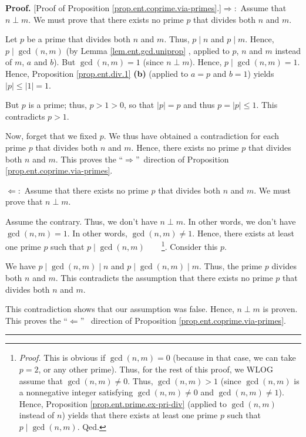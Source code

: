 \documentclass[numbers=enddot,12pt,final,onecolumn,notitlepage]{scrartcl}%
\numberwithin{exer}{subsection}
\theoremstyle{definition}
\newenvironment{proof}[1][Proof]{\noindent\textbf{#1.} }{\ \rule{0.5em}{0.5em}}
\begin{document}
\begin{proof}
[Proof of Proposition \ref{prop.ent.coprime.via-primes}.]$\Longrightarrow:$
Assume that $n\perp m$. We must prove that there exists no prime $p$ that
divides both $n$ and $m$.

Let $p$ be a prime that divides both $n$ and $m$. Thus, $p\mid n$ and $p\mid
m$. Hence, $p\mid\gcd\left(  n,m\right)  $ (by Lemma \ref{lem.ent.gcd.uniprop}%
, applied to $p$, $n$ and $m$ instead of $m$, $a$ and $b$). But $\gcd\left(
n,m\right)  =1$ (since $n\perp m$). Hence, $p\mid\gcd\left(  n,m\right)  =1$.
Hence, Proposition \ref{prop.ent.div.1} \textbf{(b)} (applied to $a=p$ and
$b=1$) yields $\left\vert p\right\vert \leq\left\vert 1\right\vert =1$.

But $p$ is a prime; thus, $p>1>0$, so that $\left\vert p\right\vert =p$ and
thus $p=\left\vert p\right\vert \leq1$. This contradicts $p>1$.

Now, forget that we fixed $p$. We thus have obtained a contradiction for each
prime $p$ that divides both $n$ and $m$. Hence, there exists no prime $p$ that
divides both $n$ and $m$. This proves the \textquotedblleft$\Longrightarrow
$\textquotedblright\ direction of Proposition
\ref{prop.ent.coprime.via-primes}.

$\Longleftarrow:$ Assume that there exists no prime $p$ that divides both $n$
and $m$. We must prove that $n\perp m$.

Assume the contrary. Thus, we don't have $n\perp m$. In other words, we don't
have $\gcd\left(  n,m\right)  =1$. In other words, $\gcd\left(  n,m\right)
\neq1$. Hence, there exists at least one prime $p$ such that $p\mid\gcd\left(
n,m\right)  $\ \ \ \ \footnote{\textit{Proof.} This is obvious if $\gcd\left(
n,m\right)  =0$ (because in that case, we can take $p=2$, or any other prime).
Thus, for the rest of this proof, we WLOG assume that $\gcd\left(  n,m\right)
\neq0$. Thus, $\gcd\left(  n,m\right)  >1$ (since $\gcd\left(  n,m\right)  $
is a nonnegative integer satisfying $\gcd\left(  n,m\right)  \neq0$ and
$\gcd\left(  n,m\right)  \neq1$). Hence, Proposition
\ref{prop.ent.prime.ex-pri-div} (applied to $\gcd\left(  n,m\right)  $ instead
of $n$) yields that there exists at least one prime $p$ such that $p\mid
\gcd\left(  n,m\right)  $. Qed.}. Consider this $p$.

We have $p\mid\gcd\left(  n,m\right)  \mid n$ and $p\mid\gcd\left(
n,m\right)  \mid m$. Thus, the prime $p$ divides both $n$ and $m$. This
contradicts the assumption that there exists no prime $p$ that divides both
$n$ and $m$.

This contradiction shows that our assumption was false. Hence, $n\perp m$ is
proven. This proves the \textquotedblleft$\Longleftarrow$\textquotedblright%
\ direction of Proposition \ref{prop.ent.coprime.via-primes}.
\end{proof}
\end{document}
